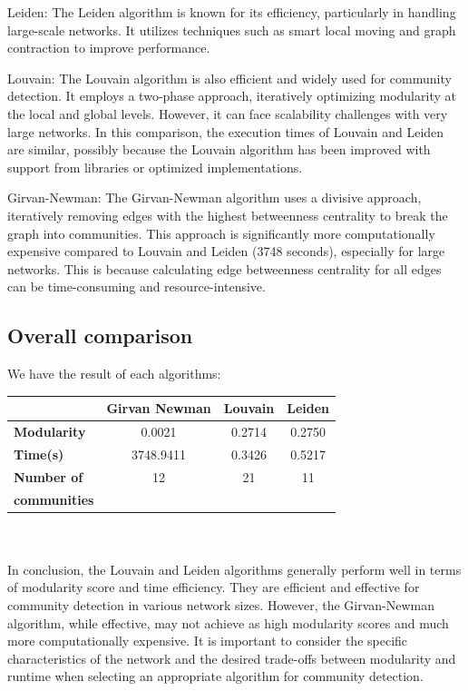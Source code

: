Leiden: The Leiden algorithm is known for its efficiency, particularly in handling large-scale networks. It utilizes techniques such as smart local moving and graph contraction to improve performance.

Louvain: The Louvain algorithm is also efficient and widely used for community detection. It employs a two-phase approach, iteratively optimizing modularity at the local and global levels. However, it can face scalability challenges with very large networks. In this comparison, the execution times of Louvain and Leiden are similar, possibly because the Louvain algorithm has been improved with support from libraries or optimized implementations.

Girvan-Newman: The Girvan-Newman algorithm uses a divisive approach, iteratively removing edges with the highest betweenness centrality to break the graph into communities. This approach is significantly more computationally expensive compared to Louvain and Leiden (3748 seconds), especially for large networks. This is because calculating edge betweenness centrality for all edges can be time-consuming and resource-intensive.

\subsection{Overall comparison}

We have the result of each algorithms: \\

\begin{tabular}{||l|c|c|c||}
    \hline \hline
     & \textbf{Girvan Newman} & \textbf{Louvain} & \textbf{Leiden}  \\ \hline
     \textbf{Modularity} & 0.0021 & 0.2714 & 0.2750\\ \hline 
     \textbf{Time(s)} & 3748.9411 & 0.3426 & 0.5217\\ \hline
     \textbf{Number of} & 12 & 21 & 11\\ 
     \textbf{communities} & & & \\ 
     \hline
     \hline
\end{tabular}
\\
\\
In conclusion, the Louvain and Leiden algorithms generally perform well in terms of modularity score and time efficiency. They are efficient and effective for community detection in various network sizes. However, the Girvan-Newman algorithm, while effective, may not achieve as high modularity scores and much more computationally expensive. It is important to consider the specific characteristics of the network and the desired trade-offs between modularity and runtime when selecting an appropriate algorithm for community detection.
